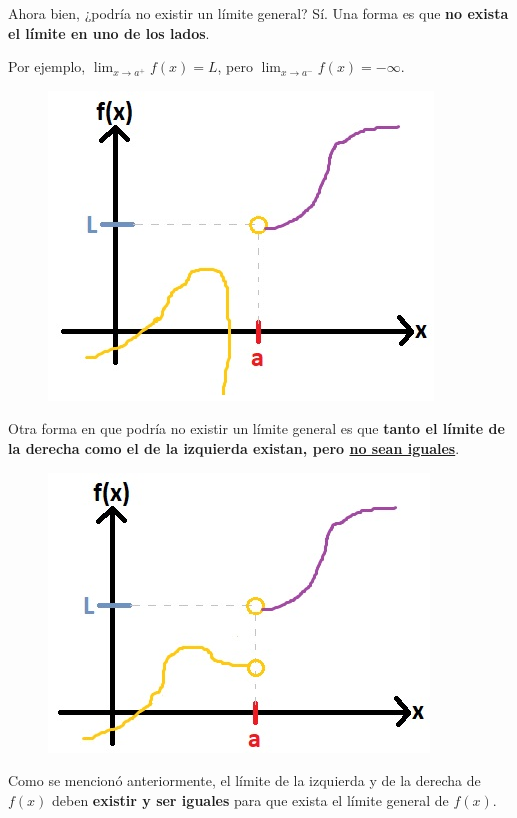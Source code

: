 \documentclass[12pt]{article}
\begin{document}
Ahora bien, ¿podría no existir un límite general? Sí. Una forma es que \textbf{no exista el límite en uno de los lados}.

Por ejemplo, $\lim_{x \to a^{+}}f(x) = L$, pero $\lim_{x \to a^{-}}f(x) = -\infty$.

\begin{figure}[hbt]
\centering
\includegraphics[scale=0.6]{img/overall_limit_2.jpg}
\end{figure}

Otra forma en que podría no existir un límite general es que \textbf{tanto el límite de la derecha como el de la izquierda existan, pero \underline{no sean iguales}}.

\begin{figure}[hbt]
\centering
\includegraphics[scale=0.7]{img/overall_limit_3.jpg}
\end{figure}

Como se mencionó anteriormente, el límite de la izquierda y de la derecha de $f(x)$ deben \textbf{existir y ser iguales} para que exista el límite general de $f(x)$.
\end{document}
